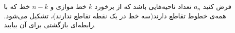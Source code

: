 \EXERCISE
فرض کنید
$a_n$
تعداد ناحیه‌هایی باشد که از برخورد
$k$
خط موازی و
$n - k$
خط که با همه‌ی خطوط تقاطع دارند(سه خط در یک نقطه تقاطع ندارند)، تشکیل می‌شود. رابطه‌ای بازگشتی برای آن بیابید.